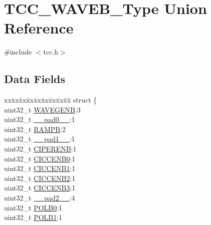 \hypertarget{union_t_c_c___w_a_v_e_b___type}{}\section{T\+C\+C\+\_\+\+W\+A\+V\+E\+B\+\_\+\+Type Union Reference}
\label{union_t_c_c___w_a_v_e_b___type}


{\ttfamily \#include $<$tcc.\+h$>$}

\subsection*{Data Fields}
\begin{DoxyCompactItemize}
\item 
\begin{tabbing}
xx\=xx\=xx\=xx\=xx\=xx\=xx\=xx\=xx\=\kill
struct \{\\
\>uint32\_t \mbox{\hyperlink{union_t_c_c___w_a_v_e_b___type_a70896df5930f1a00b3e091224b79334f}{WAVEGENB}}:3\\
\>uint32\_t \mbox{\hyperlink{union_t_c_c___w_a_v_e_b___type_a3e57c2ef1c3ffb36722f000cc1156824}{\_\_pad0\_\_}}:1\\
\>uint32\_t \mbox{\hyperlink{union_t_c_c___w_a_v_e_b___type_af5dbcd595627d2a25862af25c7b4389f}{RAMPB}}:2\\
\>uint32\_t \mbox{\hyperlink{union_t_c_c___w_a_v_e_b___type_a6712ba6dd1d5b43d2d56ff8ac4e275a7}{\_\_pad1\_\_}}:1\\
\>uint32\_t \mbox{\hyperlink{union_t_c_c___w_a_v_e_b___type_a670e10890d1bcdb837fe76d48015cebb}{CIPERENB}}:1\\
\>uint32\_t \mbox{\hyperlink{union_t_c_c___w_a_v_e_b___type_ab0bc8f83290ec69d400d2a25052ceb2c}{CICCENB0}}:1\\
\>uint32\_t \mbox{\hyperlink{union_t_c_c___w_a_v_e_b___type_a6e1c68f0e38763e0806710340e2c0781}{CICCENB1}}:1\\
\>uint32\_t \mbox{\hyperlink{union_t_c_c___w_a_v_e_b___type_a3aa8a4854952ca49548310d34c8ac018}{CICCENB2}}:1\\
\>uint32\_t \mbox{\hyperlink{union_t_c_c___w_a_v_e_b___type_a7d1c3bcbb4578082b1b62a544c639101}{CICCENB3}}:1\\
\>uint32\_t \mbox{\hyperlink{union_t_c_c___w_a_v_e_b___type_a9ce12a63de64ef64ae2d59d128251cae}{\_\_pad2\_\_}}:4\\
\>uint32\_t \mbox{\hyperlink{union_t_c_c___w_a_v_e_b___type_a5b959ff135399d199f9fc219d026a835}{POLB0}}:1\\
\>uint32\_t \mbox{\hyperlink{union_t_c_c___w_a_v_e_b___type_a2cd488369b5f95a7a2e2ffc3c4022720}{POLB1}}:1\\

\end{tabbing}
\end{DoxyCompactItemize}

